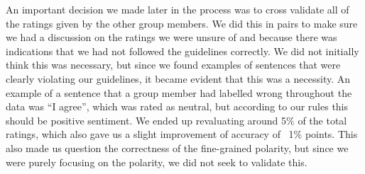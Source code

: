 An important decision we made later in the process was to cross validate all of the ratings given by the other group members. We did this in pairs to make sure we had a discussion on the ratings we were unsure of and because there was indications that we had not followed the guidelines correctly. We did not initially think this was necessary, but since we found examples of sentences that were clearly violating our guidelines, it became evident that this was a necessity. 
An example of a sentence that a group member had labelled wrong throughout the data was “I agree”, which was rated as neutral, but according to our rules this should be positive sentiment. We ended up revaluating around 5\% of the total ratings, which also gave us a slight improvement of accuracy of ~1\% points. This also made us question the correctness of the fine-grained polarity, but since we were purely focusing on the polarity, we did not seek to validate this.
